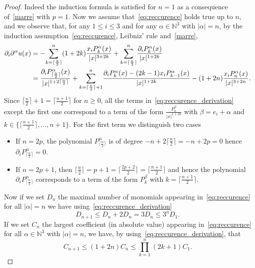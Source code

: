 \documentclass[10pt]{amsart}
\theoremstyle{definition}\newtheorem{defi}[theo]{Definition}\newtheorem{rema}[theo]{Remark}\newtheorem{exam}[theo]{Example}\newtheorem{exem}[theo]{Example}\newtheorem{nota}[theo]{Notation}
\newcommand{\N}{\mathbb{N}}
\renewcommand{\leq}{\leqslant}
\renewcommand{\geq}{\geqslant}
\begin{document}
\begin{proof}
Indeed the induction formula is satisfied for $n=1$ as a consequence of~\eqref{marre} with $p=1$. Now we assume that~\eqref{eq:reccurence} holds true up to $n$, and we observe that, for any $1 \leq i \leq 3$ and for any $\alpha \in \N^3$ with $|\alpha|=n$, by the induction assumption~\eqref{eq:reccurence}, Leibniz' rule and~\eqref{marre},
\begin{equation}\label{eq:reccurence_derivation}
\begin{split}
\partial_i \partial^\alpha u(x)&= - \underset{k=\lceil \frac{n}{2}\rceil}{\overset{n}{\sum}} (1+2k)\frac{x_i P_k^\alpha(x)}{|x|^{3+2k}}+\underset{k=\lceil\frac{n}{2}\rceil}{\overset{n}{\sum}} \frac{\partial_i P_k^\alpha(x)}{|x|^{1+2k}} \notag \\
&= \frac{\partial_i P^\alpha_{\lceil\frac{n}{2}\rceil}(x)}{|x|^{1+2\lceil\frac{n}{2}\rceil}} + \underset{k=\lceil\frac{n}{2}\rceil+1}{\overset{n}{\sum}} \frac{\partial_i P^\alpha_k(x)-(2k-1)x_i P^\alpha_{k-1}(x)}{|x|^{1+2k}} - (1+2n)\frac{x_i P_n^\alpha(x)}{|x|^{3+2n}}.
\end{split}
\end{equation}
Since $\lceil \frac{n}{2} \rceil+1= \lceil \frac{n+1}{2} \rceil$ for $n\geq0$, all the terms in~\eqref{eq:reccurence_derivation} except the first one correspond to a term of the form $\frac{P_k^\beta}{|x|^{1+2k}} $ with $\beta=e_i+\alpha$ and $k\in \{\lceil \frac{n+1}{2} \rceil,\dots,n+1 \}$. For the first term we distinguish two cases
\begin{itemize}
\item If $n=2p$, the polynomial $P_{\lceil \frac{n}{2} \rceil}^\alpha$ is of degree $-n+ 2\lceil \frac{n}{2} \rceil=-n+2p=0 $ hence $\partial_i P_{\lceil \frac{n}{2} \rceil}^\alpha=0 $.
\item If $n=2p+1$, then $\lceil \frac{n}{2} \rceil=p+1=\lceil \frac{2p+2}{2} \rceil=\lceil \frac{n+1}{2} \rceil$ and hence the polynomial $\partial_i P_{\lceil \frac{n}{2} \rceil}^\alpha$ corresponds to a term of the form $P_k^\beta$ with $k=\lceil \frac{n+1}{2} \rceil$.
\end{itemize}
Now if we set $D_n$ the { maximal number of monomials appearing in}~\eqref{eq:reccurence} for all $|\alpha|=n$ we have using~\eqref{eq:reccurence_derivation}
\[
D_{n+1} \leq D_n + 2 D_n = 3 D_n \leq 3^{n} D_1.
\]
If we set $C_n$ the largest coefficient (in absolute value) appearing in~\eqref{eq:reccurence} for all $\alpha \in \N^3$ with $|\alpha|=n$, we have, by using~\eqref{eq:reccurence_derivation}, that
\[
C_{n+1} \leq (1+2n) C_{n} \leq \underset{k=1}{\overset{n}{\prod}} (2k+1) C_1.
\]
\end{proof}
\end{document}
